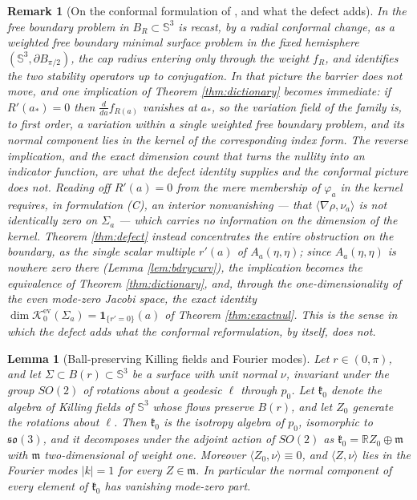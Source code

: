 \documentclass[10pt,a4paper]{amsart}
\newtheorem{lemma}[theorem]{Lemma}
\newtheorem{remark}[theorem]{Remark}
\newcommand{\R}{\mathbb{R}}
\newcommand{\Sph}{\mathbb{S}}
\newcommand{\Ker}{\mathcal{K}}
\begin{document}
\begin{remark}[On the conformal formulation of \cite{NZ1}, and what the defect adds]\label{rem:conformal}
In \cite[\S 2.5]{NZ1} the free boundary problem in $B_R\subset\Sph^3$ is recast, by a radial conformal change, as a \emph{weighted} free boundary minimal surface problem in the fixed hemisphere $(\Sph^3,\partial B_{\pi/2})$, the cap radius entering only through the weight $f_R$, and \cite[Lem. 2.6]{NZ1} identifies the two stability operators up to conjugation. In that picture the barrier does not move, and one implication of Theorem \ref{thm:dictionary} becomes immediate: if $R'(a_*)=0$ then $\tfrac{d}{da}f_{R(a)}$ vanishes at $a_*$, so the variation field of the family is, to first order, a variation \emph{within a single} weighted free boundary problem, and its normal component lies in the kernel of the corresponding index form. 
The reverse implication, and the exact dimension count that turns the nullity into an indicator function, are what the defect identity supplies and the conformal picture does not. Reading off $R'(a)=0$ from the mere membership of $\varphi_a$ in the kernel requires, in formulation (C), an
\emph{interior} nonvanishing --- that $\langle\nabla\rho,\nu_a\rangle$ is not
identically zero on $\Sigma_a$ --- which carries no information on the dimension of the kernel. Theorem \ref{thm:defect} instead concentrates the
entire obstruction on the boundary, as the single scalar multiple $r'(a)$ of $A_a(\eta,\eta)$; since $A_a(\eta,\eta)$ is nowhere zero there (Lemma \ref{lem:bdrycurv}), the implication becomes the equivalence of Theorem \ref{thm:dictionary}, and, through the one-dimensionality of the even mode-zero Jacobi space, the exact identity $\dim\Ker_0^{\mathrm{ev}}(\Sigma_a)=\mathbf{1}_{\{r'=0\}}(a)$ of Theorem \ref{thm:exactnul}. This is the sense in which the defect adds what the conformal reformulation, by itself, does not.
\end{remark}

\begin{lemma}[Ball-preserving Killing fields and Fourier modes]\label{lem:equivariance}
Let $r\in(0,\pi)$, and let $\Sigma\subset B(r)\subset\Sph^3$ be a surface with unit normal $\nu$, invariant under the group $SO(2)$ of rotations about a geodesic $\ell$ through $p_0$. Let $\mathfrak{k}_0$ denote the algebra of Killing fields of $\Sph^3$ whose flows preserve $B(r)$, and let $Z_0$ generate the rotations about $\ell$. Then $\mathfrak{k}_0$ is the isotropy algebra of $p_0$, isomorphic to $\mathfrak{so}(3)$, and it decomposes under the adjoint action of $SO(2)$ as $\mathfrak{k}_0=\R Z_0\oplus\mathfrak{m}$ with $\mathfrak{m}$ two-dimensional of weight one. Moreover $\langle Z_0,\nu\rangle\equiv 0$, and $\langle Z,\nu\rangle$ lies in the Fourier modes $|k|=1$ for every $Z\in\mathfrak{m}$. In particular the normal component of every element of $\mathfrak{k}_0$ has vanishing mode-zero part.
\end{lemma}
\end{document}
